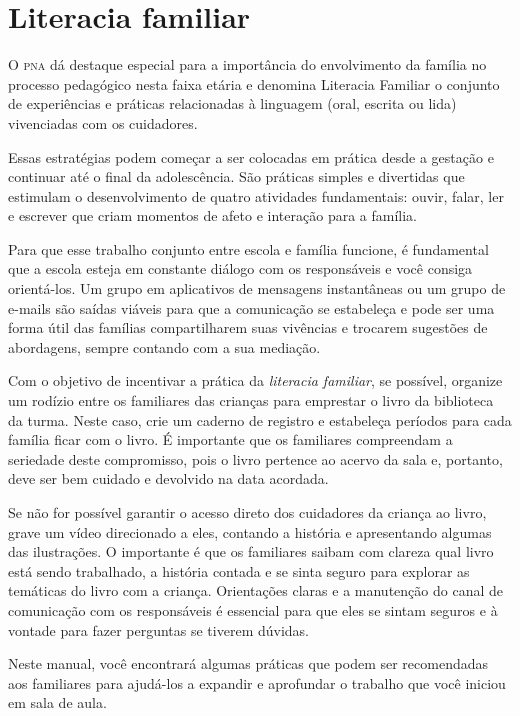 \documentclass[11pt]{extarticle}
\begin{document}
\section{Literacia familiar}
O \textsc{pna} dá destaque especial para a importância do envolvimento da família 
no processo pedagógico nesta faixa etária e denomina Literacia Familiar o conjunto 
de experiências e práticas relacionadas à linguagem (oral, escrita ou lida) vivenciadas 
com os cuidadores. 

Essas estratégias podem começar a ser colocadas em prática desde a 
gestação e continuar até o final da adolescência. São práticas simples e divertidas 
que estimulam o desenvolvimento de quatro atividades fundamentais: ouvir, falar, 
ler e escrever que criam momentos de afeto e interação para a família. 

Para que esse trabalho conjunto entre escola e família funcione, é 
fundamental que a escola esteja em constante diálogo com os responsáveis e 
você consiga orientá-los. Um grupo em aplicativos de mensagens instantâneas ou um 
grupo de e-mails são saídas viáveis para que a comunicação se estabeleça e pode ser 
uma forma útil das famílias compartilharem suas vivências e trocarem sugestões 
de abordagens, sempre contando com a sua mediação. 

Com o objetivo de incentivar 
a prática da \textit{literacia familiar}, se possível, organize um rodízio entre os familiares 
das crianças para emprestar o livro da biblioteca da turma. Neste caso, crie um caderno 
de registro e estabeleça períodos para cada família ficar com o livro. É importante 
que os familiares compreendam a seriedade deste compromisso, pois o livro pertence 
ao acervo da sala e, portanto, deve ser bem cuidado e devolvido na data acordada. 

Se não for possível garantir o acesso direto dos cuidadores da criança ao livro, 
grave um vídeo direcionado a eles, contando a história e apresentando algumas 
das ilustrações. O importante é que os familiares saibam com clareza qual livro 
está sendo trabalhado, a história contada e se sinta seguro para explorar as temáticas 
do livro com a criança. Orientações claras e a manutenção do canal de comunicação com 
os responsáveis é essencial para que eles se sintam seguros e à vontade para fazer perguntas 
se tiverem dúvidas. 

Neste manual, você encontrará algumas práticas que podem ser 
recomendadas aos familiares para ajudá-los a expandir e aprofundar o trabalho 
que você iniciou em sala de aula.
\end{document}
